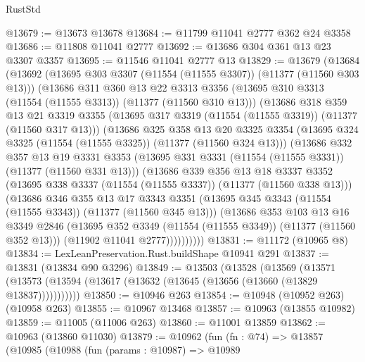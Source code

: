 \begin{lexlean}{RustStd}
\begin{coremodule}
@13679 := @13673 @13678
@13684 := @11799 @11041 @2777 @362 @24 @3358
@13686 := @11808 @11041 @2777
@13692 := @13686 @304 @361 @13 @23 @3307 @3357
@13695 := @11546 @11041 @2777 @13
@13829 := @13679
    (@13684
      (@13692
        (@13695 @303 @3307 (@11554 (@11555 @3307)) (@11377 (@11560 @303 @13)))
        (@13686
          @311
          @360
          @13
          @22
          @3313
          @3356
          (@13695 @310 @3313 (@11554 (@11555 @3313)) (@11377 (@11560 @310 @13)))
          (@13686
            @318
            @359
            @13
            @21
            @3319
            @3355
            (@13695 @317 @3319 (@11554 (@11555 @3319)) (@11377 (@11560 @317 @13)))
            (@13686
              @325
              @358
              @13
              @20
              @3325
              @3354
              (@13695 @324 @3325 (@11554 (@11555 @3325)) (@11377 (@11560 @324 @13)))
              (@13686
                @332
                @357
                @13
                @19
                @3331
                @3353
                (@13695 @331 @3331 (@11554 (@11555 @3331)) (@11377 (@11560 @331 @13)))
                (@13686
                  @339
                  @356
                  @13
                  @18
                  @3337
                  @3352
                  (@13695 @338 @3337 (@11554 (@11555 @3337)) (@11377 (@11560 @338 @13)))
                  (@13686
                    @346
                    @355
                    @13
                    @17
                    @3343
                    @3351
                    (@13695 @345 @3343 (@11554 (@11555 @3343)) (@11377 (@11560 @345 @13)))
                    (@13686
                      @353
                      @103
                      @13
                      @16
                      @3349
                      @2846
                      (@13695 @352 @3349 (@11554 (@11555 @3349)) (@11377 (@11560 @352 @13)))
                      (@11902 @11041 @2777))))))))))
@13831 := @11172 (@10965 @8)
@13834 := LexLeanPreservation.Rust.buildShape @10941 @291
@13837 := @13831 (@13834 @90 @3296)
@13849 := @13503
    (@13528
      (@13569
        (@13571 (@13573 (@13594 (@13617 (@13632 (@13645 (@13656 (@13660 (@13829 @13837)))))))))))
@13850 := @10946 @263
@13854 := @10948 (@10952 @263) (@10958 @263)
@13855 := @10967 @13468
@13857 := @10963 (@13855 @10982)
@13859 := @11005 (@11006 @263)
@13860 := @11001 @13859
@13862 := @10963 (@13860 @11030)
@13879 := @10962
    (fun (fn : @74) =>
    @13857
      (@10985
        (@10988
          (fun (params : @10987) =>
          @10989

\end{coremodule}
\end{lexlean}
